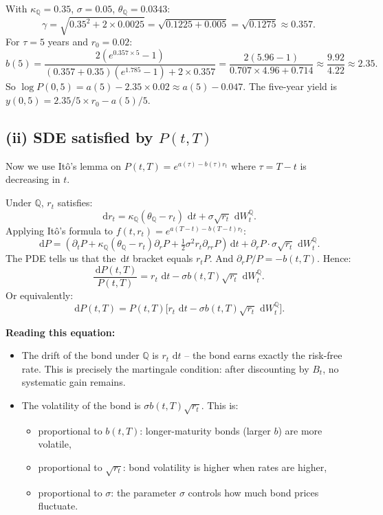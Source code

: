 \documentclass[11pt]{article}
\newcommand{\QQ}{\mathbb{Q}}
\newcommand{\dd}{\,\mathrm{d}}
\begin{document}
\begin{example_box}
With $\kappa_\QQ=0.35$, $\sigma=0.05$, $\theta_\QQ=0.0343$:
\[
\gamma = \sqrt{0.35^2 + 2\times0.0025} = \sqrt{0.1225+0.005} = \sqrt{0.1275} \approx 0.357.
\]
For $\tau = 5$ years and $r_0 = 0.02$:
\[
b(5) = \frac{2(e^{0.357\times5}-1)}{(0.357+0.35)(e^{1.785}-1)+2\times0.357}
= \frac{2(5.96-1)}{0.707\times 4.96 + 0.714}
\approx \frac{9.92}{4.22}\approx 2.35.
\]
So $\log P(0,5) = a(5) - 2.35\times 0.02 \approx a(5) - 0.047$.
The five-year yield is $y(0,5) = 2.35/5\times r_0 - a(5)/5$.
\end{example_box}

\subsection{(ii) SDE satisfied by $P(t,T)$}

Now we use It\^o's lemma on $P(t,T) = e^{a(\tau)-b(\tau)r_t}$ where
$\tau = T-t$ is decreasing in $t$.

Under $\QQ$, $r_t$ satisfies:
\[
\dd r_t = \kappa_\QQ(\theta_\QQ-r_t)\,\dd t + \sigma\sqrt{r_t}\,\dd W_t^\QQ.
\]
Applying It\^o's formula to $f(t,r_t) = e^{a(T-t)-b(T-t)r_t}$:
\[
\dd P = \left(\partial_t P + \kappa_\QQ(\theta_\QQ-r_t)\partial_r P
+ \tfrac{1}{2}\sigma^2 r_t\partial_{rr}P\right)\dd t
+ \partial_r P\cdot\sigma\sqrt{r_t}\,\dd W_t^\QQ.
\]
The PDE tells us that the $\dd t$ bracket equals $r_t P$.  And
$\partial_r P / P = -b(t,T)$.  Hence:
\[
\frac{\dd P(t,T)}{P(t,T)}
= r_t\,\dd t - \sigma b(t,T)\sqrt{r_t}\,\dd W_t^\QQ.
\]
Or equivalently:
\[
\dd P(t,T) = P(t,T)\big[r_t\,\dd t - \sigma b(t,T)\sqrt{r_t}\,\dd W_t^\QQ\big].
\]

\textbf{Reading this equation:}
\begin{itemize}
  \item The drift of the bond under $\QQ$ is $r_t\,\dd t$ -- the bond
  earns exactly the risk-free rate.  This is precisely the martingale
  condition: after discounting by $B_t$, no systematic gain remains.
  \item The volatility of the bond is $\sigma b(t,T)\sqrt{r_t}$.  This is:
  \begin{itemize}
    \item proportional to $b(t,T)$: longer-maturity bonds (larger $b$) are
    more volatile,
    \item proportional to $\sqrt{r_t}$: bond volatility is higher when rates
    are higher,
    \item proportional to $\sigma$: the parameter $\sigma$ controls how much
    bond prices fluctuate.
  \end{itemize}
\end{itemize}
\end{document}
